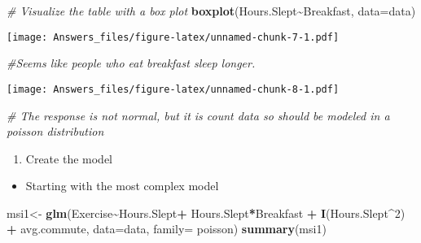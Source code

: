 \documentclass[
]{article}
\newenvironment{Shaded}{\begin{snugshade}}{\end{snugshade}}
\newcommand{\AttributeTok}[1]{\textcolor[rgb]{0.13,0.29,0.53}{#1}}
\newcommand{\CommentTok}[1]{\textcolor[rgb]{0.56,0.35,0.01}{\textit{#1}}}
\newcommand{\DecValTok}[1]{\textcolor[rgb]{0.00,0.00,0.81}{#1}}
\newcommand{\FunctionTok}[1]{\textcolor[rgb]{0.13,0.29,0.53}{\textbf{#1}}}
\newcommand{\NormalTok}[1]{#1}
\newcommand{\OtherTok}[1]{\textcolor[rgb]{0.56,0.35,0.01}{#1}}
\newcommand{\SpecialCharTok}[1]{\textcolor[rgb]{0.81,0.36,0.00}{\textbf{#1}}}
\providecommand{\tightlist}{%
  \setlength{\itemsep}{0pt}\setlength{\parskip}{0pt}}
\begin{document}
\begin{Shaded}
\begin{Highlighting}[]
\CommentTok{\# Visualize the table with a box plot}
\FunctionTok{boxplot}\NormalTok{(Hours.Slept}\SpecialCharTok{\textasciitilde{}}\NormalTok{Breakfast, }\AttributeTok{data=}\NormalTok{data)}
\end{Highlighting}
\end{Shaded}

\texttt{[image: Answers\_files/figure-latex/unnamed-chunk-7-1.pdf]}

\begin{Shaded}
\begin{Highlighting}[]
\CommentTok{\#Seems like people who eat breakfast sleep longer.}
\end{Highlighting}
\end{Shaded}

\begin{Shaded}
\end{Shaded}

\texttt{[image: Answers\_files/figure-latex/unnamed-chunk-8-1.pdf]}

\begin{Shaded}
\begin{Highlighting}[]
\CommentTok{\# The response is not normal, but it is count data so should be modeled in a poisson distribution}
\end{Highlighting}
\end{Shaded}

\begin{enumerate}
\def\labelenumi{\arabic{enumi}.}
\setcounter{enumi}{2}
\tightlist
\item
  Create the model
\end{enumerate}

\begin{itemize}
\tightlist
\item
  Starting with the most complex model
\end{itemize}

\begin{Shaded}
\begin{Highlighting}[]
\NormalTok{msi1}\OtherTok{\textless{}{-}} \FunctionTok{glm}\NormalTok{(Exercise}\SpecialCharTok{\textasciitilde{}}\NormalTok{Hours.Slept}\SpecialCharTok{+}\NormalTok{ Hours.Slept}\SpecialCharTok{*}\NormalTok{Breakfast }\SpecialCharTok{+} \FunctionTok{I}\NormalTok{(Hours.Slept}\SpecialCharTok{\^{}}\DecValTok{2}\NormalTok{) }\SpecialCharTok{+}\NormalTok{ avg.commute, }\AttributeTok{data=}\NormalTok{data, }\AttributeTok{family=}\NormalTok{ poisson)}
\FunctionTok{summary}\NormalTok{(msi1)}
\end{Highlighting}
\end{Shaded}
\end{document}

